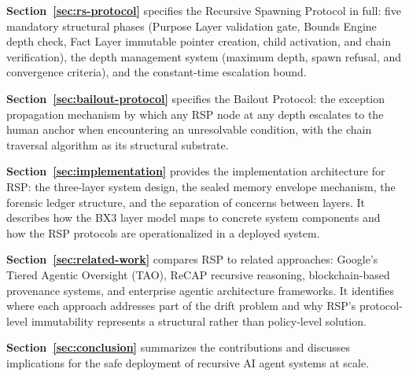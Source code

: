\textbf{Section~\ref{sec:rs-protocol}} specifies the Recursive Spawning Protocol in full: five mandatory structural phases (Purpose Layer validation gate, Bounds Engine depth check, Fact Layer immutable pointer creation, child activation, and chain verification), the depth management system (maximum depth, spawn refusal, and convergence criteria), and the constant-time escalation bound.

\textbf{Section~\ref{sec:bailout-protocol}} specifies the Bailout Protocol: the exception propagation mechanism by which any RSP node at any depth escalates to the human anchor when encountering an unresolvable condition, with the chain traversal algorithm as its structural substrate.

\textbf{Section~\ref{sec:implementation}} provides the implementation architecture for RSP: the three-layer system design, the sealed memory envelope mechanism, the forensic ledger structure, and the separation of concerns between layers. It describes how the BX3 layer model maps to concrete system components and how the RSP protocols are operationalized in a deployed system.

\textbf{Section~\ref{sec:related-work}} compares RSP to related approaches: Google's Tiered Agentic Oversight (TAO), ReCAP recursive reasoning, blockchain-based provenance systems, and enterprise agentic architecture frameworks. It identifies where each approach addresses part of the drift problem and why RSP's protocol-level immutability represents a structural rather than policy-level solution.

\textbf{Section~\ref{sec:conclusion}} summarizes the contributions and discusses implications for the safe deployment of recursive AI agent systems at scale.


